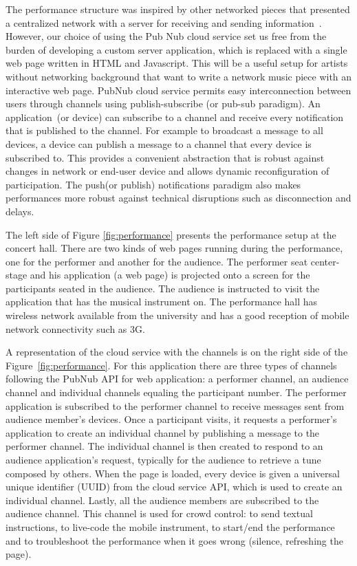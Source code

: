 The performance structure was inspired by other networked pieces that presented a centralized network with a server for receiving and sending information~\citep{Weinberg2005interconnected}.
However, our choice of using the Pub Nub cloud service set us free from the burden of developing a custom server application, which is replaced with a single web page written in HTML and Javascript.
This will be a useful setup for artists without networking background that want to write a network music piece with an interactive web page.
PubNub cloud service permits easy interconnection between users through channels using publish-subscribe (or pub-sub paradigm).
An application~(or device) can subscribe to a channel and receive every notification that is published to the channel. 
For example to broadcast a message to all devices, a device can publish a message to a channel that every device is subscribed to. 
This provides a convenient abstraction that is robust against changes in network or end-user device and allows dynamic reconfiguration of participation.
The push(or publish) notifications paradigm also makes performances more robust against technical disruptions such as disconnection and delays.

The left side of Figure \ref{fig:performance} presents the performance setup at the concert hall.
There are two kinds of web pages running during the performance, one for the performer and another for the audience.
The performer seat center-stage and his application (a web page) is projected onto a screen for the participants seated in the audience.
The audience is instructed to visit the application that has the musical instrument on.
The performance hall has wireless network available from the university and has a good reception of mobile network connectivity such as 3G.

A representation of the cloud service with the channels is on the right side of the Figure~\ref{fig:performance}.
For this application there are three types of channels following the PubNub API for web application: a performer channel, an audience channel and individual channels equaling the participant number. 
The performer application is subscribed to the performer channel to receive messages sent from audience member's devices. 
Once a participant visits, it requests a performer's application to create an individual channel by publishing a message to the performer channel.
The individual channel is then created to respond to an audience application's request, typically for the audience to retrieve a tune composed by others.
When the page is loaded, every device is given a universal unique identifier (UUID) from the cloud service API, which is used to create an individual channel.
Lastly, all the audience members are subscribed to the audience channel. 
This channel is used for crowd control: to send textual instructions, to live-code the mobile instrument, to start/end the performance and to troubleshoot the performance when it goes wrong (silence, refreshing the page).

